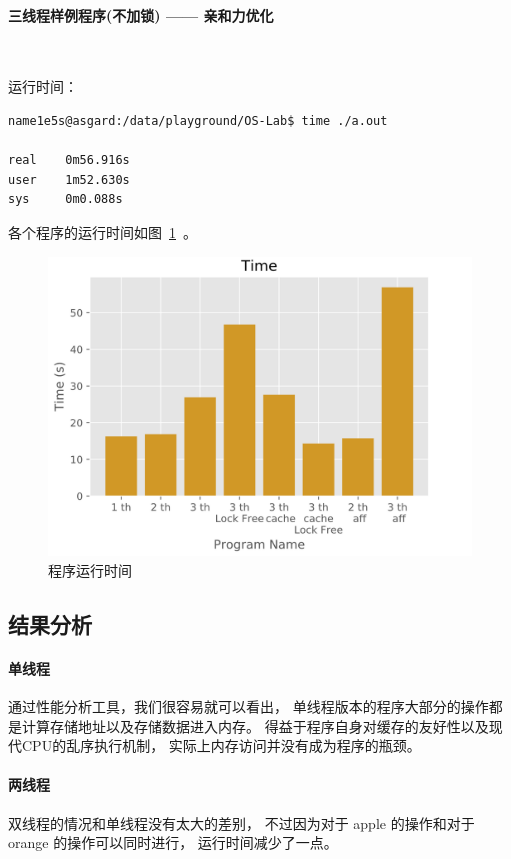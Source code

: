 \documentclass[blue,normal,cn]{elegantnote}
\begin{document}
\paragraph{三线程样例程序(不加锁) —— 亲和力优化}
\ 

运行时间：
\begin{lstlisting}
name1e5s@asgard:/data/playground/OS-Lab$ time ./a.out 

real    0m56.916s
user    1m52.630s
sys     0m0.088s
\end{lstlisting}

各个程序的运行时间如图~\ref{fig:RunningTime}~。

\begin{figure}[!htbp]
  \centering
  \includegraphics[width=.8\textwidth]{fig/lab-8}
  \caption{程序运行时间}
  \label{fig:RunningTime}
\end{figure}

\subsection{结果分析}

\paragraph{单线程} 通过性能分析工具，我们很容易就可以看出，
单线程版本的程序大部分的操作都是计算存储地址以及存储数据进入内存。
得益于程序自身对缓存的友好性以及现代CPU的乱序执行机制，
实际上内存访问并没有成为程序的瓶颈。

\paragraph{两线程} 双线程的情况和单线程没有太大的差别，
不过因为对于 apple 的操作和对于 orange 的操作可以同时进行，
运行时间减少了一点。
\end{document}
